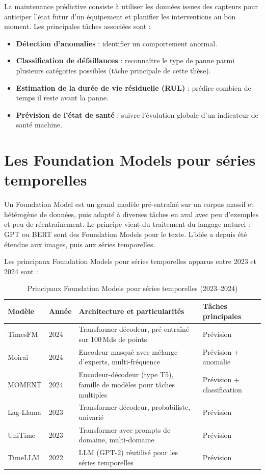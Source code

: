 \documentclass[12pt, a4paper]{report}
\begin{document}
La maintenance prédictive consiste à utiliser les données issues des capteurs pour
anticiper l'état futur d'un équipement et planifier les interventions au bon moment.
Les principales tâches associées sont :

\begin{itemize}
  \item \textbf{Détection d'anomalies} : identifier un comportement anormal.
  \item \textbf{Classification de défaillances} : reconnaître le type de panne
  parmi plusieurs catégories possibles (tâche principale de cette thèse).
  \item \textbf{Estimation de la durée de vie résiduelle (RUL)} : prédire combien
  de temps il reste avant la panne.
  \item \textbf{Prévision de l'état de santé} : suivre l'évolution globale d'un
  indicateur de santé machine.
\end{itemize}

\section{Les Foundation Models pour séries temporelles}

Un Foundation Model est un grand modèle pré-entraîné sur un corpus massif et
hétérogène de données, puis adapté à diverses tâches en aval avec peu d'exemples
et peu de réentraînement. Le principe vient du traitement du langage naturel :
GPT ou BERT sont des Foundation Models pour le texte. L'idée a depuis été étendue
aux images, puis aux séries temporelles.

Les principaux Foundation Models pour séries temporelles apparus entre 2023 et 2024 sont :

\begin{table}[h!]
\centering
\caption{Principaux Foundation Models pour séries temporelles (2023--2024)}
\label{tab:tsfm-comparison}
\renewcommand{\arraystretch}{1.5}
\begin{tabularx}{\textwidth}{llXl}
\toprule
Modèle & Année & Architecture et particularités & Tâches principales \\
\midrule
TimesFM & 2024 & Transformer décodeur, pré-entraîné sur 100\,Mds de points
& Prévision \\
Moirai & 2024 & Encodeur masqué avec mélange d'experts, multi-fréquence
& Prévision + anomalie \\
MOMENT & 2024 & Encodeur-décodeur (type T5), famille de modèles pour tâches multiples
& Prévision + classification \\
Lag-Llama & 2023 & Transformer décodeur, probabiliste, univarié
& Prévision \\
UniTime & 2023 & Transformer avec prompts de domaine, multi-domaine
& Prévision \\
TimeLLM & 2022 & LLM (GPT-2) réutilisé pour les séries temporelles
& Prévision \\
\bottomrule
\end{tabularx}
\end{table}
\end{document}
